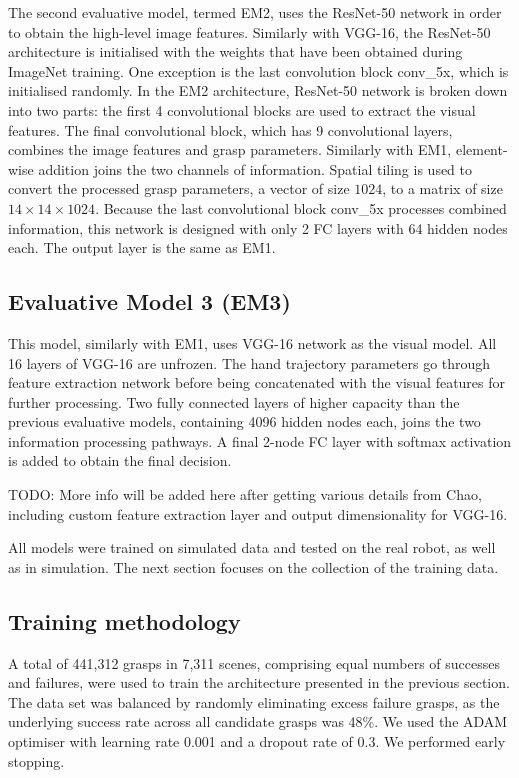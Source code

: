 The second evaluative model, termed EM2, uses the ResNet-50 network in order to obtain the high-level image features. Similarly with VGG-16, the ResNet-50 architecture is initialised with the weights that have been obtained during ImageNet training. One exception is the last convolution block conv\_5x, which is initialised randomly. In the EM2 architecture, ResNet-50 network is broken down into two parts: the first 4 convolutional blocks are used to extract the visual features. The final convolutional block, which has 9 convolutional layers, combines the image features and grasp parameters. Similarly with EM1, element-wise addition joins the two channels of information. Spatial tiling is used to convert the processed grasp parameters, a vector of size $1024$, to a matrix of size $14 \times 14 \times 1024$. Because the last convolutional block conv\_5x processes combined information, this network is designed with only 2 FC layers with 64 hidden nodes each. The output layer is the same as EM1. 

\subsection{Evaluative Model 3 (EM3)}

This model, similarly with EM1, uses VGG-16 network as the visual model. All 16 layers of VGG-16 are unfrozen. The hand trajectory parameters go through feature extraction network before being concatenated with the visual features for further processing. Two fully connected layers of higher capacity than the previous evaluative models, containing 4096 hidden nodes each, joins the two information processing pathways. A final 2-node FC layer with softmax activation is added to obtain the final decision.

TODO: More info will be added here after getting various details from Chao, including custom feature extraction layer and output dimensionality for VGG-16.

All models were trained on simulated data and tested on the real robot, as well as in simulation. The next section focuses on the collection of the training data.

\subsection{Training methodology}
A total of 441,312 grasps in 7,311 scenes, comprising equal numbers of successes and failures, were used to train the architecture presented in the previous section. The data set was balanced by randomly eliminating excess failure grasps, as the underlying success rate across all candidate grasps was 48\%. We used the ADAM optimiser with learning rate 0.001 and a dropout rate of 0.3. We performed early stopping.